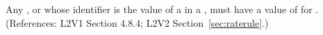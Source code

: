 Any \Compartment, \Species or \Parameter whose identifier is the value of a
  in a \RateRule, must have a value of 
for .  (References: L2V1 Section 4.8.4; L2V2
Section~\ref{sec:raterule}.)
